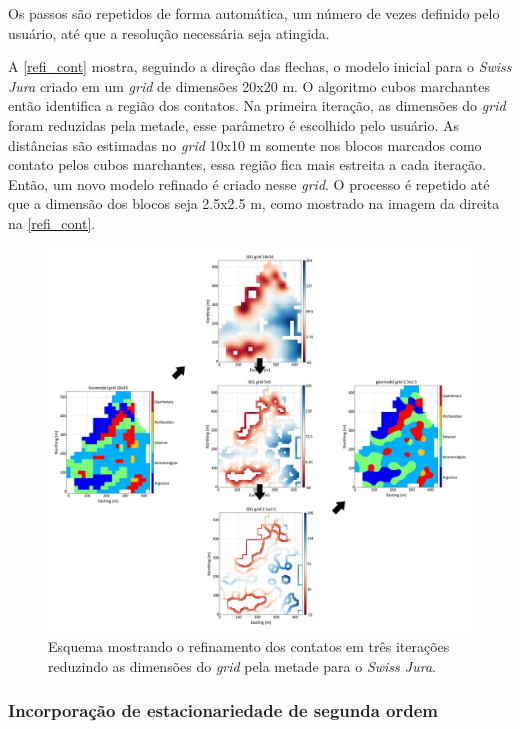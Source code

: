 Os passos são repetidos de forma automática, um número de vezes definido pelo usuário, até que a resolução necessária seja atingida.

A \autoref{refi_cont} mostra, seguindo a direção das flechas, o modelo inicial para o \textit{Swiss Jura} criado em um \textit{grid} de dimensões 20x20 m. O algoritmo cubos marchantes então identifica a região dos contatos. Na primeira iteração, as dimensões do \textit{grid} foram reduzidas pela metade, esse parâmetro é escolhido pelo usuário. As distâncias são estimadas no \textit{grid} 10x10 m somente nos blocos marcados como contato pelos cubos marchantes, essa região fica mais estreita a cada iteração. Então, um novo modelo refinado é criado nesse \textit{grid}. O processo é repetido até que a dimensão dos blocos seja 2.5x2.5 m, como mostrado na imagem da direita na \autoref{refi_cont}.

\begin{figure}[H]
\caption{\label{refi_cont} Esquema mostrando o refinamento dos contatos em três iterações reduzindo as dimensões do \textit{grid} pela metade para o \textit{Swiss Jura}.}
	\centering
		\includegraphics[width=\textwidth]{capitulo_2/imagens/bound_refinement.png}
\end{figure}

\subsubsection{Incorporação de estacionariedade de segunda ordem}

